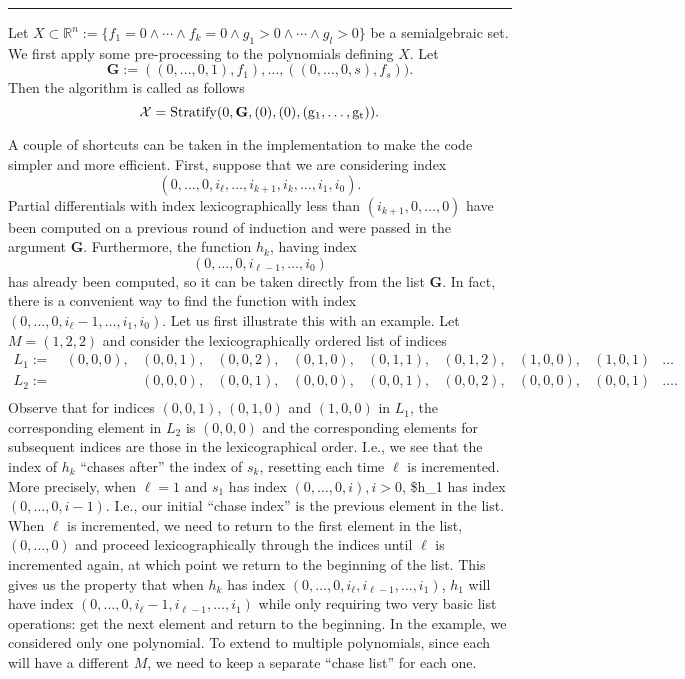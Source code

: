 \documentclass[
]{book}
\theoremstyle{definition}
\theoremstyle{definition}
\theoremstyle{definition}
\theoremstyle{definition}
\theoremstyle{remark}
\begin{document}
\begin{center}\rule{0.5\linewidth}{0.5pt}\end{center}

Let \(X \subset \mathbb{R}^n := \{ f_1 = 0 \land \cdots \land f_k = 0 \land g_1 > 0 \land \cdots \land g_l > 0 \}\) be a semialgebraic set. We first apply some pre-processing to the polynomials defining \(X\). Let \[
\mathbf{G} := ((0,\ldots,0,1), f_1),\ldots, ((0,\ldots,0,s),f_s)).
\]
Then the algorithm is called as follows
\[
\cal{X} = \rm{Stratify}(0, \mathbf{G}, (0), (0), (g_1,\ldots,g_t)).
\]

A couple of shortcuts can be taken in the implementation to make the code simpler and more efficient.
First, suppose that we are considering index
\[
(0,\ldots,0,i_\ell,\ldots,i_{k+1},i_k,\ldots,i_1,i_0).\]
Partial differentials with index lexicographically less than \((i_{k+1},0,\ldots,0)\) have been computed on a previous round of induction and were passed in the argument \(\mathbf{G}\).
Furthermore, the function \(h_k\), having index
\[
(0,\ldots,0,i_{\ell -1},\ldots,i_0)
\]
has already been computed, so it can be taken directly from the list \(\mathbf{G}\).
In fact, there is a convenient way to find the function with index \((0,\ldots,0,i_\ell - 1, \ldots,i_1,i_0)\). Let us first illustrate this with an example. Let \(M = (1,2,2)\) and consider the lexicographically ordered list of indices
\[
\begin{matrix}
L_1 :=\ &  (0,0,0),&(0,0,1),&(0,0,2),&(0,1,0),&(0,1,1),&(0,1,2),&(1,0,0),&(1,0,1)&\ldots\\
L_2 := \ & & (0,0,0),&(0,0,1),&(0,0,0),&(0,0,1),&(0,0,2),&(0,0,0),&(0,0,1)&\ldots.\\
\end{matrix}
\]
Observe that for indices \((0,0,1)\), \((0,1,0)\) and \((1,0,0)\) in \(L_1\), the corresponding element in \(L_2\) is \((0,0,0)\) and the corresponding elements for subsequent indices are those in the lexicographical order.
I.e., we see that the index of \(h_k\) ``chases after'' the index of \(s_k\), resetting each time \(\ell\) is incremented.
More precisely, when \(\ell = 1\) and \(s_1\) has index \((0,\ldots,0,i),i>0\), \$h\_1 has index \((0,\ldots,0,i-1)\). I.e., our initial ``chase index'' is the previous element in the list. When \(\ell\) is incremented, we need to return to the first element in the list, \((0,\ldots,0)\) and proceed lexicographically through the indices until \(\ell\) is incremented again, at which point we return to the beginning of the list. This gives us the property that when \(h_k\) has index \((0,\ldots,0,i_\ell,i_{\ell-1},\ldots,i_1)\), \(h_1\) will have index \((0,\ldots,0,i_\ell - 1,i_{\ell - 1},\ldots,i_1)\) while only requiring two very basic list operations: get the next element and return to the beginning. In the example, we considered only one polynomial. To extend to multiple polynomials, since each will have a different \(M\), we need to keep a separate ``chase list'' for each one.
\end{document}
